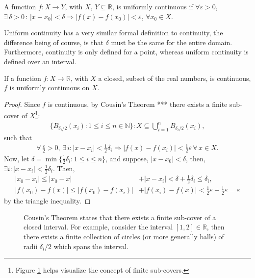 \begin{definition}
A function $f: X \rightarrow Y$, with $X, \, Y \subseteq \mathbb{R}$, is uniformly continuous if $\forall \varepsilon > 0$, $\exists \, \delta > 0 \, : \, |x-x_0| < \delta \Rightarrow |f(x) - f(x_0)| < \varepsilon$, $ \forall x_0 \in X$.
\end{definition}

Uniform continuity has a very similar formal definition to continuity, the difference being of course, is that  $\delta$ must be the same for the entire domain. Furthermore, continuity is only defined for a point, whereas uniform continuity is defined over an interval.

\begin{theorem}[Heine-Cantor Theorem ***]
If a function $f: X \rightarrow \mathbb{R}$, with $X$ a closed, subset of the real numbers, is continuous, $f$ is uniformly continuous on $X$.
\label{thm:uniform}
\end{theorem}
\begin{proof}
Since $f$ is continuous, by Cousin's Theorem *** there exists a finite sub-cover of $X$\footnote[4]{Figure \ref{fig:arrows} helps visualize the concept of finite sub-covers.}:
\begin{align*}
\{ B_{\delta_i/2} (x_i) : 1 \leq i \leq n \in \mathbb{N} \} : X \subseteq \bigcup_{i=1}^n B_{\delta_i/2}(x_i),
\end{align*}
such that
\begin{align*}
\forall \, \frac{\varepsilon}{2} > 0, \, \exists \, i : |x-x_i| < \frac{1}{2} \delta_i \Rightarrow |f(x)-f(x_i)| < \frac{1}{2}\varepsilon \, \forall \, x \in X.
\end{align*}
Now, let $\delta = \min \{ \frac{1}{2} \delta_i : 1 \leq i \leq n \}$, and suppose, $|x-x_0| < \delta$, then, $\exists i : |x-x_i| < \frac{1}{2}\delta_i$.  Then,
\begin{align*}
|x_0-x_i| \leq |x_0-x| &+ |x-x_i| < \delta + \frac{1}{2}\delta_i \leq \delta_i, \\
|f(x_0)-f(x)| \leq |f(x_0)-f(x_i)| &+ |f(x_i)-f(x)| < \frac{1}{2}\varepsilon + \frac{1}{2}\varepsilon = \varepsilon
\end{align*}
by the triangle inequality.
\end{proof}

\begin{figure}[!p]
\centering

\caption{Cousin's Theorem states that there exists a finite sub-cover of a closed interval. For example, consider the interval $[1,2] \in \mathbb{R}$, then there exists a finite collection of circles (or more generally balls) of radii $\delta_i/2$ which spans the interval.}
\label{fig:arrows}
\end{figure}

